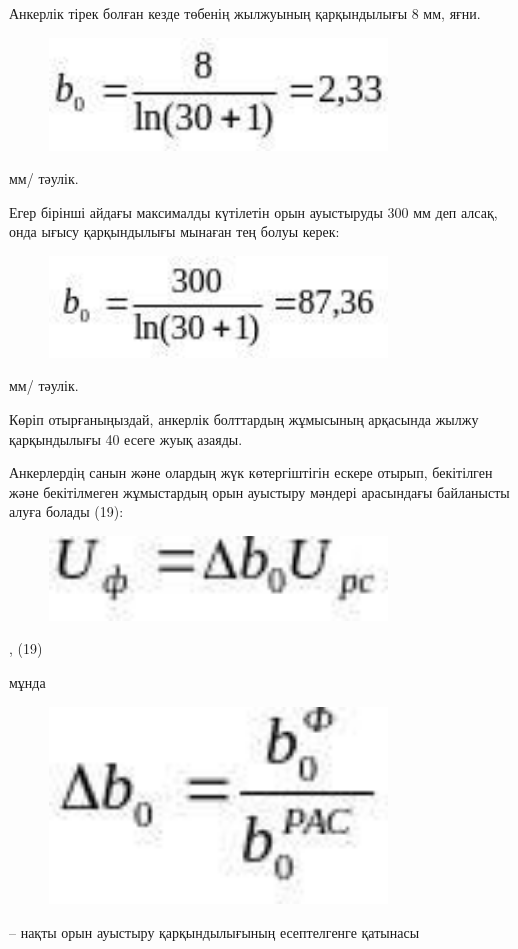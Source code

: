 Анкерлік тірек болған кезде төбенің жылжуының қарқындылығы 8 мм, яғни.

\begin{figure}[H]
	\centering
	\includegraphics[width=0.8\textwidth]{assets/1326}
	\caption*{}
\end{figure} мм/ тәулік.

Егер бірінші айдағы максималды күтілетін орын ауыстыруды 300 мм деп
алсақ, онда ығысу қарқындылығы мынаған тең болуы керек:

\begin{figure}[H]
	\centering
	\includegraphics[width=0.8\textwidth]{assets/1327}
	\caption*{}
\end{figure} мм/ тәулік.

Көріп отырғаныңыздай, анкерлік болттардың жұмысының арқасында жылжу
қарқындылығы 40 есеге жуық азаяды.

Анкерлердің санын және олардың жүк көтергіштігін ескере отырып,
бекітілген және бекітілмеген жұмыстардың орын ауыстыру мәндері
арасындағы байланысты алуға болады (19):

\begin{figure}[H]
	\centering
	\includegraphics[width=0.8\textwidth]{assets/1328}
	\caption*{}
\end{figure}, (19)

мұнда \begin{figure}[H]
	\centering
	\includegraphics[width=0.8\textwidth]{assets/1329}
	\caption*{}
\end{figure} -- нақты орын ауыстыру
қарқындылығының есептелгенге қатынасы

